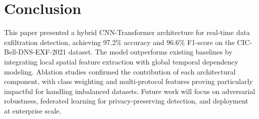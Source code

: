 \documentclass[conference]{IEEEtran}
\begin{document}
\section{Conclusion}
\label{sec:conclusion}

This paper presented a hybrid CNN-Transformer architecture for real-time data exfiltration detection, achieving 97.2\% accuracy and 96.6\% F1-score on the CIC-Bell-DNS-EXF-2021 dataset. The model outperforms existing baselines by integrating local spatial feature extraction with global temporal dependency modeling. Ablation studies confirmed the contribution of each architectural component, with class weighting and multi-protocol features proving particularly impactful for handling imbalanced datasets. Future work will focus on adversarial robustness, federated learning for privacy-preserving detection, and deployment at enterprise scale.



\end{document}

